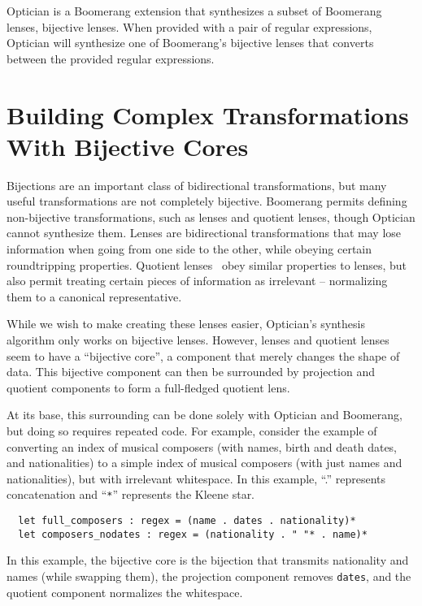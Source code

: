\documentclass[a4paper]{article}
\begin{document}
Optician is a Boomerang extension that synthesizes a subset of Boomerang lenses,
bijective lenses. When provided with a pair of regular expressions, Optician
will synthesize one of Boomerang's bijective lenses that converts between the
provided regular expressions.

\section{Building Complex Transformations With Bijective Cores}

Bijections are an important class of bidirectional transformations, but many
useful transformations are not completely bijective. Boomerang permits defining
non-bijective transformations, such as lenses and quotient lenses, though
Optician cannot synthesize them. Lenses are bidirectional transformations that
may lose information when going from one side to the other, while obeying
certain roundtripping properties. Quotient lenses~\cite{quotientlenses} obey
similar properties to lenses, but also permit treating certain pieces of
information as irrelevant -- normalizing them to a canonical representative.

While we wish to make creating these lenses easier, Optician's synthesis algorithm
only works on bijective lenses. However, lenses and quotient lenses seem to have
a ``bijective core'', a component that merely changes the shape of data.
This bijective component can then be surrounded by projection and quotient
components to form a full-fledged quotient lens.

At its base, this surrounding can be done solely with Optician and Boomerang,
but doing so requires repeated code. For example, consider the example of
converting an index of musical composers (with names, birth and death dates, and
nationalities) to a simple index of musical composers (with just names and
nationalities), but with irrelevant whitespace. In this example, ``.''
represents concatenation and ``\lstinline{*}'' represents the Kleene star.

\begin{lstlisting}
  let full_composers : regex = (name . dates . nationality)*
  let composers_nodates : regex = (nationality . " "* . name)*
\end{lstlisting}

In this example, the bijective core is the bijection that transmits nationality and
names (while swapping them), the projection component removes \lstinline{dates},
and the quotient component normalizes the whitespace.
\end{document}
